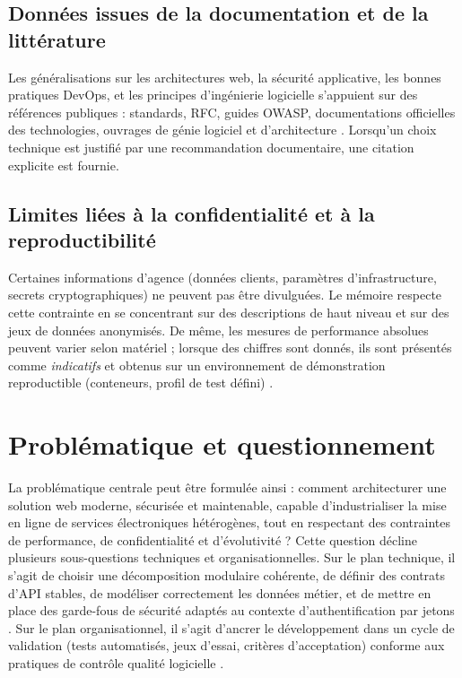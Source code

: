 \subsection{Données issues de la documentation et de la littérature}

Les généralisations sur les architectures web, la sécurité applicative, les bonnes pratiques DevOps, et les principes d'ingénierie logicielle s'appuient sur des références publiques : standards, RFC, guides OWASP, documentations officielles des technologies, ouvrages de génie logiciel et d'architecture \cite{owasp2021,iso25010,pressman2014,booch2005,kleppmann2017}. Lorsqu'un choix technique est justifié par une recommandation documentaire, une citation explicite est fournie.

\subsection{Limites liées à la confidentialité et à la reproductibilité}

Certaines informations d'agence (données clients, paramètres d'infrastructure, secrets cryptographiques) ne peuvent pas être divulguées. Le mémoire respecte cette contrainte en se concentrant sur des descriptions de haut niveau et sur des jeux de données anonymisés. De même, les mesures de performance absolues peuvent varier selon matériel ; lorsque des chiffres sont donnés, ils sont présentés comme \emph{indicatifs} et obtenus sur un environnement de démonstration reproductible (conteneurs, profil de test défini) \cite{ieee1012}.

\section{Problématique et questionnement}

La problématique centrale peut être formulée ainsi : comment architecturer une solution web moderne, sécurisée et maintenable, capable d'industrialiser la mise en ligne de services électroniques hétérogènes, tout en respectant des contraintes de performance, de confidentialité et d'évolutivité ? Cette question décline plusieurs sous-questions techniques et organisationnelles. Sur le plan technique, il s'agit de choisir une décomposition modulaire cohérente, de définir des contrats d'API stables, de modéliser correctement les données métier, et de mettre en place des garde-fous de sécurité adaptés au contexte d'authentification par jetons \cite{rfc7519,owasp2021}. Sur le plan organisationnel, il s'agit d'ancrer le développement dans un cycle de validation (tests automatisés, jeux d'essai, critères d'acceptation) conforme aux pratiques de contrôle qualité logicielle \cite{sommerville2016,ieee1012}.

